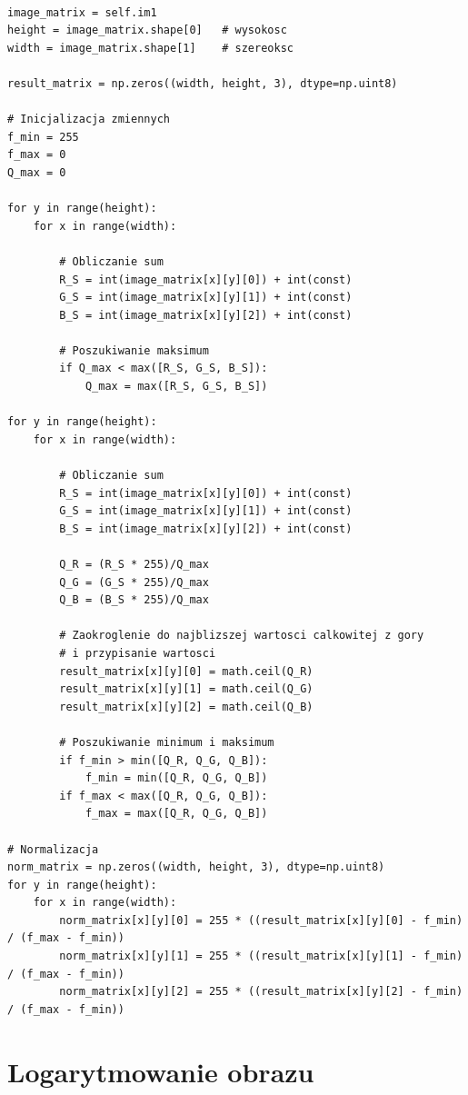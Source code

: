 \documentclass[final,a4paper,openany,12pt]{mwbk}
\begin{document}
\begin{lstlisting}[caption= Pierwiastkowanie obrazu barwowego]

image_matrix = self.im1
height = image_matrix.shape[0]   # wysokosc
width = image_matrix.shape[1]    # szereoksc

result_matrix = np.zeros((width, height, 3), dtype=np.uint8)

# Inicjalizacja zmiennych
f_min = 255
f_max = 0
Q_max = 0

for y in range(height):
    for x in range(width):  

        # Obliczanie sum
        R_S = int(image_matrix[x][y][0]) + int(const)
        G_S = int(image_matrix[x][y][1]) + int(const)
        B_S = int(image_matrix[x][y][2]) + int(const)

        # Poszukiwanie maksimum
        if Q_max < max([R_S, G_S, B_S]):
            Q_max = max([R_S, G_S, B_S])

for y in range(height):
    for x in range(width):  

        # Obliczanie sum
        R_S = int(image_matrix[x][y][0]) + int(const)
        G_S = int(image_matrix[x][y][1]) + int(const)
        B_S = int(image_matrix[x][y][2]) + int(const)

        Q_R = (R_S * 255)/Q_max
        Q_G = (G_S * 255)/Q_max
        Q_B = (B_S * 255)/Q_max
            
        # Zaokroglenie do najblizszej wartosci calkowitej z gory
        # i przypisanie wartosci
        result_matrix[x][y][0] = math.ceil(Q_R)
        result_matrix[x][y][1] = math.ceil(Q_G)
        result_matrix[x][y][2] = math.ceil(Q_B)

        # Poszukiwanie minimum i maksimum                
        if f_min > min([Q_R, Q_G, Q_B]):
            f_min = min([Q_R, Q_G, Q_B])
        if f_max < max([Q_R, Q_G, Q_B]):
            f_max = max([Q_R, Q_G, Q_B])

# Normalizacja
norm_matrix = np.zeros((width, height, 3), dtype=np.uint8)
for y in range(height):
    for x in range(width):
        norm_matrix[x][y][0] = 255 * ((result_matrix[x][y][0] - f_min) / (f_max - f_min))
        norm_matrix[x][y][1] = 255 * ((result_matrix[x][y][1] - f_min) / (f_max - f_min))
        norm_matrix[x][y][2] = 255 * ((result_matrix[x][y][2] - f_min) / (f_max - f_min))

\end{lstlisting}


\section{ Logarytmowanie obrazu}
\end{document}
